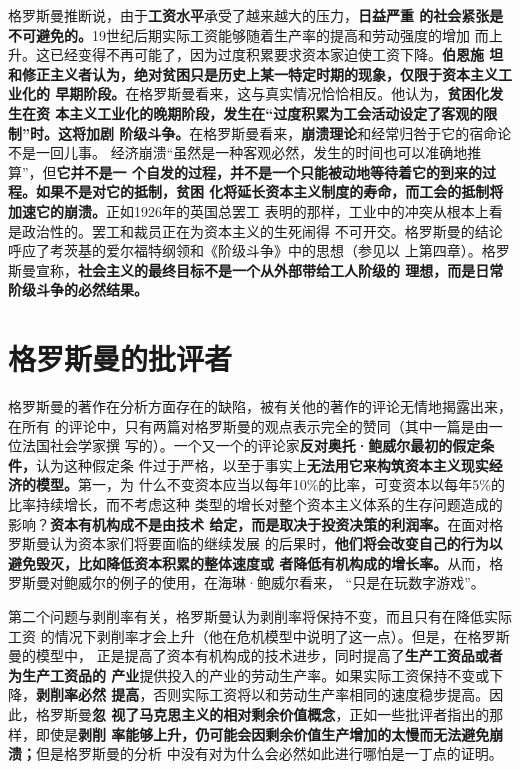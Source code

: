 格罗斯曼推断说，由于\textbf{工资水平}承受了越来越大的压力，\textbf{日益严重
的社会紧张是不可避免的。}19世纪后期实际工资能够随着生产率的提高和劳动强度的增加
而上升。这已经变得不再可能了，因为过度积累要求资本家迫使工资下降。\textbf{伯恩施
坦和修正主义者认为，绝对贫困只是历史上某一特定时期的现象，仅限于资本主义工业化的
早期阶段。}在格罗斯曼看来，这与真实情况恰恰相反。他认为，\textbf{贫困化发生在资
本主义工业化的晚期阶段，发生在“过度积累为工会活动设定了客观的限制”时。这将加剧
阶级斗争。}在格罗斯曼看来，\textbf{崩溃理论}和经常归咎于它的宿命论不是一回儿事。
经济崩溃“虽然是一种客观必然，发生的时间也可以准确地推算”，但\textbf{它并不是一
个自发的过程，并不是一个只能被动地等待着它的到来的过程。如果不是对它的抵制，贫困
化将延长资本主义制度的寿命，而工会的抵制将加速它的崩溃。}正如1926年的英国总罢工
表明的那样，工业中的冲突从根本上看是政治性的。罢工和裁员正在为资本主义的生死闹得
不可开交。格罗斯曼的结论呼应了考茨基的爱尔福特纲领和《阶级斗争》中的思想（参见以
上第四章）。格罗斯曼宣称，\textbf{社会主义的最终目标不是一个从外部带给工人阶级的
理想，而是日常阶级斗争的必然结果。}


\section{格罗斯曼的批评者}

格罗斯曼的著作在分析方面存在的缺陷，被有关他的著作的评论无情地揭露出来，在所有
的评论中，只有两篇对格罗斯曼的观点表示完全的赞同（其中一篇是由一位法国社会学家撰
写的）。一个又一个的评论家\textbf{反对奥托·鲍威尔最初的假定条件，}认为这种假定条
件过于严格，以至于事实上\textbf{无法用它来构筑资本主义现实经济的模型。}第一，为
什么不变资本应当以每年10\%的比率，可变资本以每年5\%的比率持续增长，而不考虑这种
类型的增长对整个资本主义体系的生存问题造成的影响？\textbf{资本有机构成不是由技术
给定，而是取决于投资决策的利润率。}在面对格罗斯曼认为资本家们将要面临的继续发展
的后果时，\textbf{他们将会改变自己的行为以避免毁灭，比如降低资本积累的整体速度或
者降低有机构成的增长率。}从而，格罗斯曼对鲍威尔的例子的使用，在海琳·鲍威尔看来，
“只是在玩数字游戏”。

第二个问题与剥削率有关，格罗斯曼认为剥削率将保持不变，而且只有在降低实际工资
的情况下剥削率才会上升（他在危机模型中说明了这一点）。但是，在格罗斯曼的模型中，
正是提高了资本有机构成的技术进步，同时提高了\textbf{生产工资品或者为生产工资品的
产业}提供投入的产业的劳动生产率。如果实际工资保持不变或下降，\textbf{剥削率必然
提高}，否则实际工资将以和劳动生产率相同的速度稳步提高。因此，格罗斯曼\textbf{忽
视了马克思主义的相对剩余价值概念}，正如一些批评者指出的那样，即使是\textbf{剥削
率能够上升，仍可能会因剩余价值生产增加的太慢而无法避免崩溃；}但是格罗斯曼的分析
中没有对为什么会必然如此进行哪怕是一丁点的证明。

